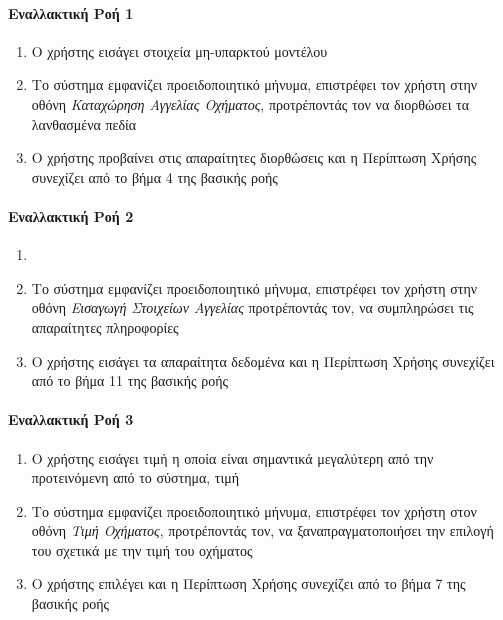 \documentclass{../ol-softwaremanual}
\begin{document}
	\paragraph{Εναλλακτική Ροή 1}
	
	\begin{enumerate}
		\item O χρήστης εισάγει στοιχεία μη-υπαρκτού μοντέλου
		\item Το σύστημα εμφανίζει προειδοποιητικό μήνυμα, επιστρέφει τον χρήστη στην οθόνη \textit{Καταχώρηση Αγγελίας Οχήματος}, προτρέποντάς τον να διορθώσει τα λανθασμένα πεδία
		\item Ο χρήστης προβαίνει στις απαραίτητες διορθώσεις και η Περίπτωση Χρήσης συνεχίζει από το βήμα 4 της βασικής ροής
	\end{enumerate}
	
	\paragraph{Εναλλακτική Ροή 2}
	
	\begin{enumerate}
		\item {}
		\item Το σύστημα εμφανίζει προειδοποιητικό μήνυμα, επιστρέφει τον χρήστη στην οθόνη \textit{Εισαγωγή Στοιχείων Αγγελίας} προτρέποντάς τον, να συμπληρώσει τις απαραίτητες πληροφορίες
		\item Ο χρήστης εισάγει τα απαραίτητα δεδομένα και η Περίπτωση Χρήσης συνεχίζει από το βήμα 11 της βασικής ροής
	\end{enumerate}
	
	\paragraph{Εναλλακτική Ροή 3}
	
	\begin{enumerate}
		\item Ο χρήστης εισάγει τιμή η οποία είναι σημαντικά μεγαλύτερη από την προτεινόμενη από το σύστημα, τιμή
		\item Το σύστημα εμφανίζει προειδοποιητικό μήνυμα, επιστρέφει τον χρήστη στον οθόνη \textit{Τιμή Οχήματος}, προτρέποντάς τον, να ξαναπραγματοποιήσει την επιλογή του σχετικά με την τιμή του οχήματος
		\item Ο χρήστης επιλέγει και η Περίπτωση Χρήσης συνεχίζει από το βήμα 7 της βασικής ροής
	\end{enumerate}
	
\end{document}
